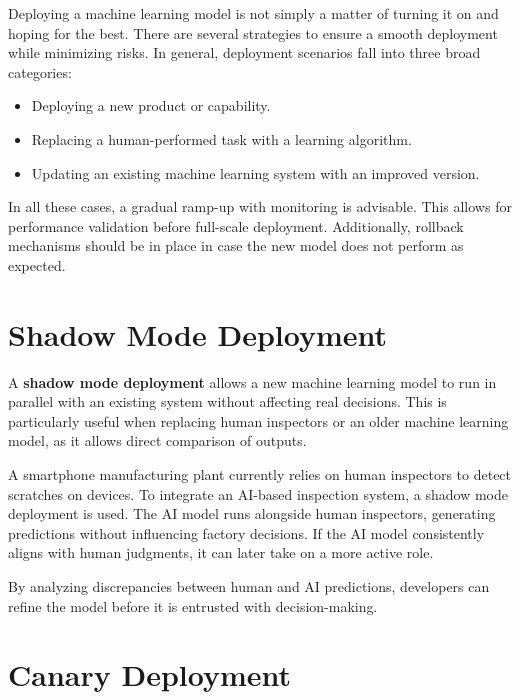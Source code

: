 \documentclass[12pt,openany, draft]{book}
\begin{document}
Deploying a machine learning model is not simply a matter of turning it on and hoping for the best. There are several strategies to ensure a smooth deployment while minimizing risks. In general, deployment scenarios fall into three broad categories:

\begin{itemize}
    \item Deploying a new product or capability.
    \item Replacing a human-performed task with a learning algorithm.
    \item Updating an existing machine learning system with an improved version.
\end{itemize}

In all these cases, a gradual ramp-up with monitoring is advisable. This allows for performance validation before full-scale deployment. Additionally, rollback mechanisms should be in place in case the new model does not perform as expected.



\section{Shadow Mode Deployment}

A \textbf{shadow mode deployment} allows a new machine learning model to run in parallel with an existing system without affecting real decisions. This is particularly useful when replacing human inspectors or an older machine learning model, as it allows direct comparison of outputs.

\begin{examplebox}
   A smartphone manufacturing plant currently relies on human inspectors to detect scratches on devices. To integrate an AI-based inspection system, a shadow mode deployment is used. The AI model runs alongside human inspectors, generating predictions without influencing factory decisions. If the AI model consistently aligns with human judgments, it can later take on a more active role.
\end{examplebox}

By analyzing discrepancies between human and AI predictions, developers can refine the model before it is entrusted with decision-making.



\section{Canary Deployment}
\end{document}
